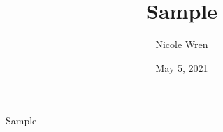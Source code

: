 \documentclass{article}
\title{Sample}
\author{Nicole Wren}
\date{May 5, 2021}
\begin{document}
\maketitle

Sample
\end{document}
